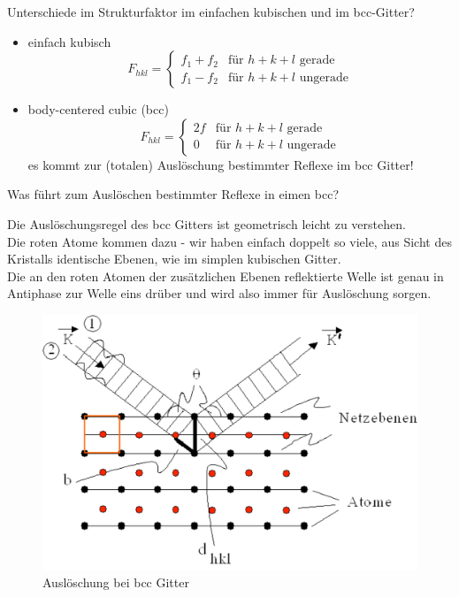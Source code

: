 \documentclass[a5paper,12pt,ngerman,grid=front %
,print
]{kartei}
\begin{document}
	\begin{karte}{
		Unterschiede im Strukturfaktor im einfachen kubischen und im bcc-Gitter?
		}
		
		\begin{itemize}
			\item einfach kubisch
				$$   F_{hkl} = 
				\begin{cases}
					f_1 + f_2 & \mbox{für } h+k+l \mbox{ gerade}\\
					f_1 - f_2 &  \mbox{für } h+k+l \mbox{ ungerade}
				\end{cases}
				$$
			\item body-centered cubic (bcc)
				$$   F_{hkl} = 
				\begin{cases}
					2f	&	\mbox{für } h+k+l \mbox{ gerade}\\
					0	&	\mbox{für } h+k+l \mbox{ ungerade}
				\end{cases}
				$$
				es kommt zur (totalen) Auslöschung bestimmter Reflexe im bcc Gitter!
		\end{itemize}
		
	\end{karte}


	\begin{karte}{
		Was führt zum Auslöschen bestimmter Reflexe in eimen bcc?
		}
		
		Die Auslöschungsregel des bcc Gitters ist geometrisch leicht zu verstehen. \\
		
		Die roten Atome kommen dazu - wir haben einfach doppelt so viele, aus Sicht des Kristalls identische Ebenen, wie im simplen kubischen Gitter. \\
		
		Die an den roten Atomen der zusätzlichen Ebenen reflektierte Welle ist genau in Antiphase zur Welle eins drüber und wird also immer für Auslöschung sorgen.
		
		\begin{figure}[htbp]
			\centering
			\includegraphics[width=0.45\linewidth]{./images/33_bcc}
			\caption{Auslöschung bei bcc Gitter}
		\end{figure}
		
	\end{karte}
\end{document}

